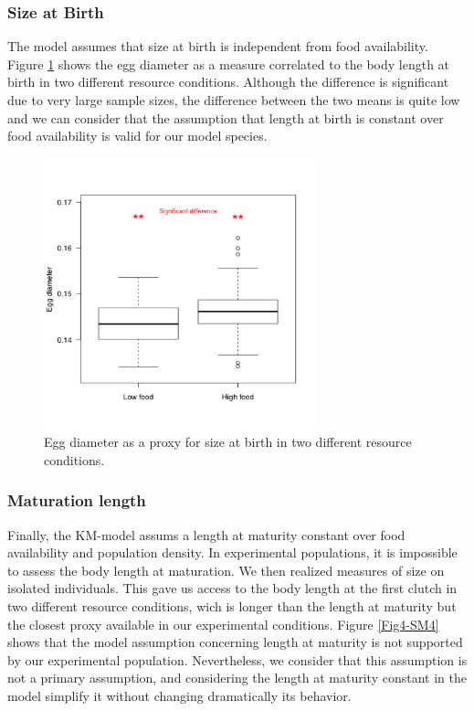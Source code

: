 \subsubsection{Size at Birth}

The model assumes that size at birth is independent from food availability.
Figure \ref{Fig4-SM3} shows the egg diameter as a measure correlated to the body
length at birth in two different resource conditions. Although the difference is
significant due to very large sample sizes, the difference between the two means
is quite low and we can consider that the assumption that length at birth is
constant over food availability is valid for our model species.

\begin{figure}[!h] %
\centering
\includegraphics[width=0.7\textwidth]{4_ChapThe1/Fig/FigSM3.pdf}
\caption[Experimental measure of size
at birth]{Egg diameter as a proxy for size at birth in two different resource
conditions.}
\label{Fig4-SM3}
\end{figure}

\subsubsection{Maturation length}

Finally, the KM-model assums a length at maturity constant over food
availability and population density. In experimental populations, it is
impossible to assess the body length at maturation. We then realized measures of
size on isolated individuals. This gave us access to the body length at the
first clutch in two different resource conditions, wich is longer than the
length at maturity but the closest proxy available in our experimental
conditions. Figure \ref{Fig4-SM4} shows that the model assumption concerning
length at maturity is not supported by our experimental population. Nevertheless, we
consider that this assumption is not a primary assumption, and considering the
length at maturity constant in the model simplify it without changing
dramatically its behavior.

